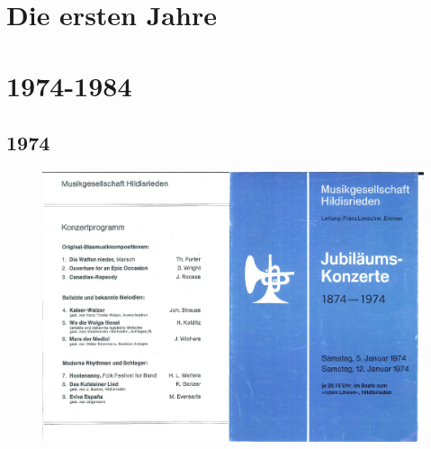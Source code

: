 \documentclass{book}
\begin{document}
%

\setlength\columnsep{30pt}


\chapter{Die ersten Jahre}





\pagebreak
\chapter{1974-1984}
\section{1974}
\begin{figure}[p]
    \includegraphics[scale=0.7]{./chap/1974/1974.pdf}
\end{figure}

\end{document}

